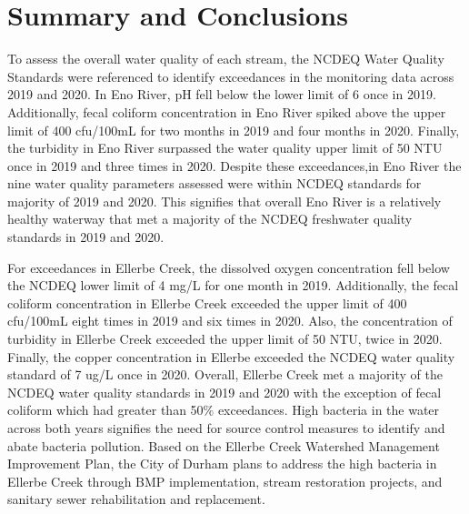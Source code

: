 \documentclass[
  12pt,
]{article}
\begin{document}
\newpage

\hypertarget{summary-and-conclusions}{%
\section{Summary and Conclusions}\label{summary-and-conclusions}}

To assess the overall water quality of each stream, the NCDEQ Water
Quality Standards were referenced to identify exceedances in the
monitoring data across 2019 and 2020. In Eno River, pH fell below the
lower limit of 6 once in 2019. Additionally, fecal coliform
concentration in Eno River spiked above the upper limit of 400 cfu/100mL
for two months in 2019 and four months in 2020. Finally, the turbidity
in Eno River surpassed the water quality upper limit of 50 NTU once in
2019 and three times in 2020. Despite these exceedances,in Eno River the
nine water quality parameters assessed were within NCDEQ standards for
majority of 2019 and 2020. This signifies that overall Eno River is a
relatively healthy waterway that met a majority of the NCDEQ freshwater
quality standards in 2019 and 2020.

For exceedances in Ellerbe Creek, the dissolved oxygen concentration
fell below the NCDEQ lower limit of 4 mg/L for one month in 2019.
Additionally, the fecal coliform concentration in Ellerbe Creek exceeded
the upper limit of 400 cfu/100mL eight times in 2019 and six times in
2020. Also, the concentration of turbidity in Ellerbe Creek exceeded the
upper limit of 50 NTU, twice in 2020. Finally, the copper concentration
in Ellerbe exceeded the NCDEQ water quality standard of 7 ug/L once in
2020. Overall, Ellerbe Creek met a majority of the NCDEQ water quality
standards in 2019 and 2020 with the exception of fecal coliform which
had greater than 50\% exceedances. High bacteria in the water across
both years signifies the need for source control measures to identify
and abate bacteria pollution. Based on the Ellerbe Creek Watershed
Management Improvement Plan, the City of Durham plans to address the
high bacteria in Ellerbe Creek through BMP implementation, stream
restoration projects, and sanitary sewer rehabilitation and replacement.
\end{document}

